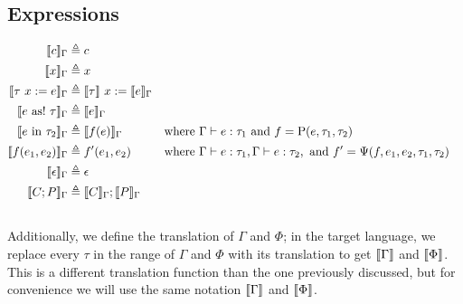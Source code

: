 \subsection{Expressions}
\begin{align*}
\source{c}_\Gamma &\triangleq c \\
\source{x}_\Gamma &\triangleq x \\
\source{\tau\ x := e}_\Gamma &\triangleq \source{\tau}\ x := \source{e}_\Gamma \\
\source{e\ \mathrm{as!}\ \tau}_\Gamma&\triangleq \source{e}_\Gamma \\
\source{e\ \mathrm{in}\ \tau_2}_\Gamma&\triangleq \source{f(e)}_\Gamma&\text{where }&\Gamma|-e:\tau_1\text{ and }f=\mathrm{P}(e,\tau_1,\tau_2)\\
\source{f(e_1, e_2)}_\Gamma&\triangleq f'(e_1, e_2)&\text{where }&\Gamma|-e:\tau_1,\Gamma|-e:\tau_2,\text{ and }f'=\Psi(f,e_1,e_2,\tau_1,\tau_2)\\
\source{\epsilon}_\Gamma&\triangleq \epsilon\\
\source{C;P}_\Gamma&\triangleq\source{C}_\Gamma;\source{P}_\Gamma\\
\end{align*}

\subsection{}
Additionally, we define the translation of $\Gamma$ and $\Phi$; in the target language, we replace every $\tau$ in the range of $\Gamma$ and $\Phi$ with its translation to get $\source{\Gamma}$ and $\source{\Phi}$. This is a different translation function than the one previously discussed, but for convenience we will use the same notation $\source{\Gamma}$ and $\source{\Phi}$.\\
\begin{lemma}
\label{lem:contexttr}
\begin{mathpar}
\end{mathpar}
\begin{mathpar}
\end{mathpar}
\end{lemma}

